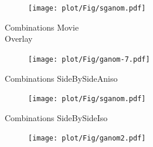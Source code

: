 \begin{frame}
  \begin{figure}
  \texttt{[image: plot/Fig/sganom.pdf]}
  \end{figure}
\end{frame}


\begin{frame}
  \begin{block}{Combinations}
    Movie \\
    Overlay \\

     \begin{figure}
     \texttt{[image: plot/Fig/ganom-7.pdf]}
     \end{figure}


  \end{block}
\end{frame}

\begin{frame}
  \begin{block}{Combinations}
    SideBySideAniso \\

     \begin{figure}
     \texttt{[image: plot/Fig/sganom.pdf]}
     \end{figure}

  \end{block}
\end{frame}

\begin{frame}
  \begin{block}{Combinations}
    SideBySideIso \\

     \begin{figure}
     \texttt{[image: plot/Fig/ganom2.pdf]}
     \end{figure}

  \end{block}
\end{frame}


